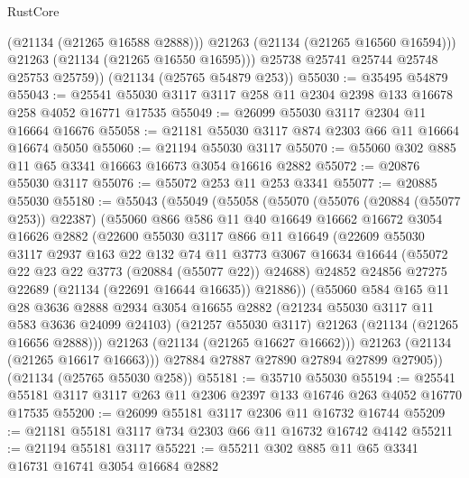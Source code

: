 \begin{lexlean}{RustCore}
\begin{coremodule}
              (@21134 (@21265 @16588 @2888)))
            @21263
            (@21134 (@21265 @16560 @16594)))
          @21263
          (@21134 (@21265 @16550 @16595)))
        @25738
        @25741
        @25744
        @25748
        @25753
        @25759))
    (@21134 (@25765 @54879 @253))
@55030 := @35495 @54879
@55043 := @25541 @55030 @3117 @3117 @258 @11 @2304 @2398 @133 @16678 @258 @4052 @16771 @17535
@55049 := @26099 @55030 @3117 @2304 @11 @16664 @16676
@55058 := @21181 @55030 @3117 @874 @2303 @66 @11 @16664 @16674 @5050
@55060 := @21194 @55030 @3117
@55070 := @55060 @302 @885 @11 @65 @3341 @16663 @16673 @3054 @16616 @2882
@55072 := @20876 @55030 @3117
@55076 := @55072 @253 @11 @253 @3341
@55077 := @20885 @55030
@55180 := @55043
    (@55049
      (@55058
        (@55070
          (@55076 (@20884 (@55077 @253)) @22387)
          (@55060
            @866
            @586
            @11
            @40
            @16649
            @16662
            @16672
            @3054
            @16626
            @2882
            (@22600
              @55030
              @3117
              @866
              @11
              @16649
              (@22609
                @55030
                @3117
                @2937
                @163
                @22
                @132
                @74
                @11
                @3773
                @3067
                @16634
                @16644
                (@55072 @22 @23 @22 @3773 (@20884 (@55077 @22)) @24688)
                @24852
                @24856
                @27275
                @22689
                (@21134 (@22691 @16644 @16635))
                @21886))
            (@55060
              @584
              @165
              @11
              @28
              @3636
              @2888
              @2934
              @3054
              @16655
              @2882
              (@21234 @55030 @3117 @11 @583 @3636 @24099 @24103)
              (@21257 @55030 @3117)
              @21263
              (@21134 (@21265 @16656 @2888)))
            @21263
            (@21134 (@21265 @16627 @16662)))
          @21263
          (@21134 (@21265 @16617 @16663)))
        @27884
        @27887
        @27890
        @27894
        @27899
        @27905))
    (@21134 (@25765 @55030 @258))
@55181 := @35710 @55030
@55194 := @25541 @55181 @3117 @3117 @263 @11 @2306 @2397 @133 @16746 @263 @4052 @16770 @17535
@55200 := @26099 @55181 @3117 @2306 @11 @16732 @16744
@55209 := @21181 @55181 @3117 @734 @2303 @66 @11 @16732 @16742 @4142
@55211 := @21194 @55181 @3117
@55221 := @55211 @302 @885 @11 @65 @3341 @16731 @16741 @3054 @16684 @2882

\end{coremodule}
\end{lexlean}
